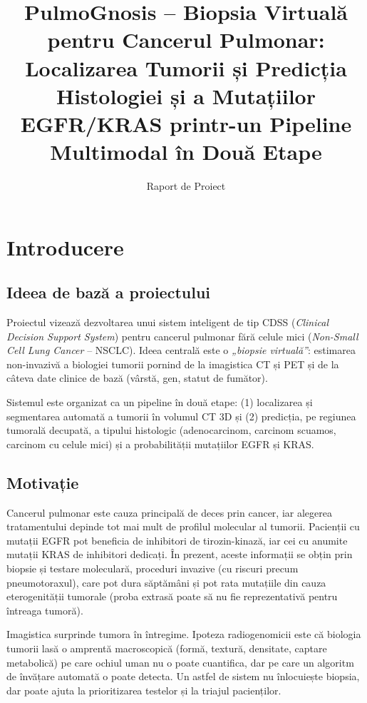 \documentclass[11pt, a4paper]{article}
\title{\textbf{PulmoGnosis -- Biopsia Virtuală pentru Cancerul Pulmonar: Localizarea Tumorii și Predicția Histologiei și a Mutațiilor EGFR/KRAS printr-un Pipeline Multimodal în Două Etape}}
\author{Raport de Proiect}
\date{}
\begin{document}
\maketitle

\section{Introducere}

\subsection{Ideea de bază a proiectului}
Proiectul vizează dezvoltarea unui sistem inteligent de tip CDSS (\textit{Clinical Decision Support System}) pentru cancerul pulmonar fără celule mici (\textit{Non-Small Cell Lung Cancer} -- NSCLC). Ideea centrală este o \textit{„biopsie virtuală''}: estimarea non-invazivă a biologiei tumorii pornind de la imagistica CT și PET și de la câteva date clinice de bază (vârstă, gen, statut de fumător).

Sistemul este organizat ca un pipeline în două etape: (1) localizarea și segmentarea automată a tumorii în volumul CT 3D și (2) predicția, pe regiunea tumorală decupată, a tipului histologic (adenocarcinom, carcinom scuamos, carcinom cu celule mici) și a probabilității mutațiilor EGFR și KRAS.

\subsection{Motivație}
Cancerul pulmonar este cauza principală de deces prin cancer, iar alegerea tratamentului depinde tot mai mult de profilul molecular al tumorii. Pacienții cu mutații EGFR pot beneficia de inhibitori de tirozin-kinază, iar cei cu anumite mutații KRAS de inhibitori dedicați. În prezent, aceste informații se obțin prin biopsie și testare moleculară, proceduri invazive (cu riscuri precum pneumotoraxul), care pot dura săptămâni și pot rata mutațiile din cauza eterogenității tumorale (proba extrasă poate să nu fie reprezentativă pentru întreaga tumoră).

Imagistica surprinde tumora în întregime. Ipoteza radiogenomicii este că biologia tumorii lasă o amprentă macroscopică (formă, textură, densitate, captare metabolică) pe care ochiul uman nu o poate cuantifica, dar pe care un algoritm de învățare automată o poate detecta. Un astfel de sistem nu înlocuiește biopsia, dar poate ajuta la prioritizarea testelor și la triajul pacienților.
\end{document}

